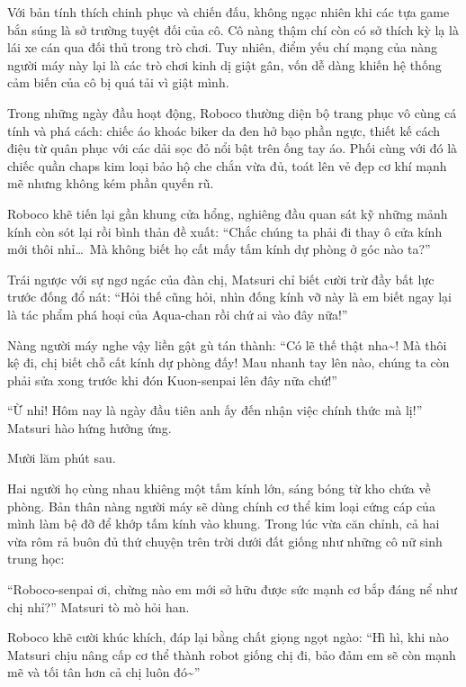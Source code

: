 \documentclass[../main.tex]{subfiles}
\begin{document}
Với bản tính thích chinh phục và chiến đấu, không ngạc nhiên khi các tựa game bắn súng là sở trường tuyệt đối của cô. Cô nàng thậm chí còn có sở thích kỳ lạ là lái xe cán qua đối thủ trong trò chơi. Tuy nhiên, điểm yếu chí mạng của nàng người máy này lại là các trò chơi kinh dị giật gân, vốn dễ dàng khiến hệ thống cảm biến của cô bị quá tải vì giật mình.

Trong những ngày đầu hoạt động, Roboco thường diện bộ trang phục vô cùng cá tính và phá cách: chiếc áo khoác biker da đen hở bạo phần ngực, thiết kế cách điệu từ quân phục với các dải sọc đỏ nổi bật trên ống tay áo. Phối cùng với đó là chiếc quần chaps kim loại bảo hộ che chắn vừa đủ, toát lên vẻ đẹp cơ khí mạnh mẽ nhưng không kém phần quyến rũ.

\chrint


Roboco khẽ tiến lại gần khung cửa hổng, nghiêng đầu quan sát kỹ những mảnh kính còn sót lại rồi bình thản đề xuất: ``Chắc chúng ta phải đi thay ô cửa kính mới thôi nhỉ\dots\ Mà không biết họ cất mấy tấm kính dự phòng ở góc nào ta?''

Trái ngược với sự ngơ ngác của đàn chị, Matsuri chỉ biết cười trừ đầy bất lực trước đống đổ nát: ``Hỏi thế cũng hỏi, nhìn đống kính vỡ này là em biết ngay lại là tác phẩm phá hoại của Aqua-chan rồi chứ ai vào đây nữa!''

Nàng người máy nghe vậy liền gật gù tán thành: ``Có lẽ thế thật nha\~{}! Mà thôi kệ đi, chị biết chỗ cất kính dự phòng đấy! Mau nhanh tay lên nào, chúng ta còn phải sửa xong trước khi đón Kuon-senpai lên đây nữa chứ!''

``Ừ nhỉ! Hôm nay là ngày đầu tiên anh ấy đến nhận việc chính thức mà lị!'' Matsuri hào hứng hưởng ứng.

\ct

Mười lăm phút sau.

Hai người họ cùng nhau khiêng một tấm kính lớn, sáng bóng từ kho chứa về phòng. Bản thân nàng người máy sẽ dùng chính cơ thể kim loại cứng cáp của mình làm bệ đỡ để khớp tấm kính vào khung. Trong lúc vừa căn chỉnh, cả hai vừa rôm rả buôn đủ thứ chuyện trên trời dưới đất giống như những cô nữ sinh trung học:

``Roboco-senpai ơi, chừng nào em mới sở hữu được sức mạnh cơ bắp đáng nể như chị nhỉ?'' Matsuri tò mò hỏi han.

Roboco khẽ cười khúc khích, đáp lại bằng chất giọng ngọt ngào: ``Hì hì, khi nào Matsuri chịu nâng cấp cơ thể thành robot giống chị đi, bảo đảm em sẽ còn mạnh mẽ và tối tân hơn cả chị luôn đó\~{}''
\end{document}
